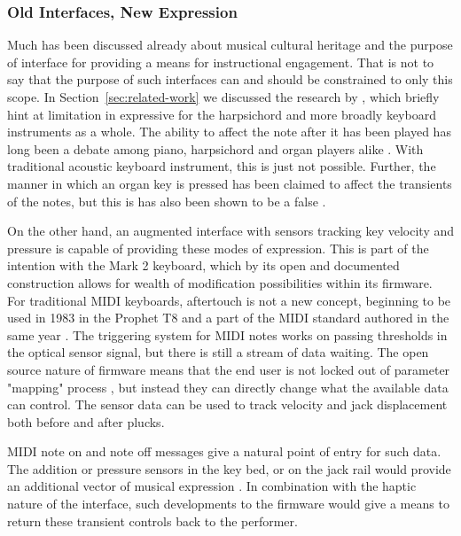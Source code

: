 \subsubsection{Old Interfaces, New Expression}

Much has been discussed already about musical cultural heritage and the purpose
of interface for providing a means for instructional engagement. That is not to
say that the purpose of such interfaces can and should be constrained to only
this scope. In Section~\ref{sec:related-work} we discussed the research by
\textcite{oboe_mikey_2006}, which briefly hint at limitation in expressive for
the harpsichord and more broadly keyboard instruments as a whole. The ability to
affect the note after it has been played has long been a debate among piano,
harpsichord and organ players alike \cite{macritchie_using_2015}. With
traditional acoustic keyboard instrument, this is just not possible. Further,
the manner in which an organ key is pressed has been claimed to affect the
transients of the notes, but this is has also been shown to be a false
\cite{woolley_musical_2017}.

On the other hand, an augmented interface with sensors tracking key velocity and
pressure is capable of providing these modes of expression. This is part of the
intention with the Mark 2 keyboard, which by its open and documented
construction allows for wealth of modification possibilities within its
firmware. For traditional MIDI keyboards, aftertouch is not a new concept,
beginning to be used in 1983 in the Prophet T8 \cite{wiffen_prophet_1983} and a
part of the MIDI standard authored in the same year
\cite{jungleib_complete_1983}. The triggering system for MIDI notes works on
passing thresholds in the optical sensor signal, but there is still a stream of
data waiting. The open source nature of firmware means that the end user is not
locked out of parameter "mapping" process \cite{hunt_importance_2002}, but
instead they can directly change what the available data can control. The sensor
data can be used to track velocity and jack displacement both before and after
plucks.

MIDI note on and note off messages give a natural point of entry for such data.
The addition or pressure sensors in the key bed, or on the jack rail would
provide  an additional vector of musical expression \cite{hamilton_two_2025}. In
combination with the haptic nature of the interface, such developments to the
firmware would give a means to return these transient controls
\cite{woolley_musical_2017} back to the performer.

